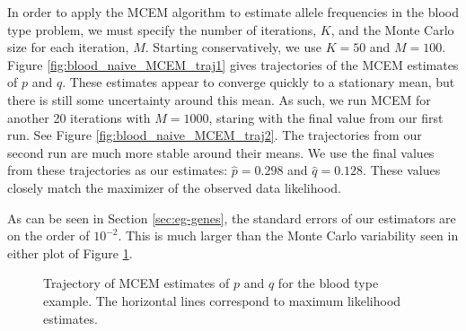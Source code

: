 \documentclass[ss]{imsart}
\theoremstyle{plain}
\theoremstyle{definition}
\theoremstyle{remark}
\begin{document}
In order to apply the MCEM algorithm to estimate allele frequencies in the blood type problem, we must specify the number of iterations, $K$, and the Monte Carlo size for each iteration, $M$. Starting conservatively, we use $K=50$ and $M=100$. Figure \ref{fig:blood_naive_MCEM_traj1} gives trajectories of the MCEM estimates of $p$ and $q$. These estimates appear to converge quickly to a stationary mean, but there is still some uncertainty around this mean. As such, we run MCEM for another 20 iterations with $M=1000$, staring with the final value from our first run. See Figure \ref{fig:blood_naive_MCEM_traj2}. The trajectories from our second run are much more stable around their means. We use the final values from these trajectories as our estimates: $\hat{p} = 0.298$ and $\hat{q} = 0.128$. These values closely match the maximizer of the observed data likelihood. 

As can be seen in Section \ref{sec:eg-genes}, the standard errors of our estimators are on the order of $10^{-2}$. This is much larger than the Monte Carlo variability seen in either plot of Figure \ref{fig:blood_naive_MCEM_traj}.

   



\begin{figure}
    \centering
    \caption{Trajectory of MCEM estimates of $p$ and $q$ for the blood type example. The horizontal lines correspond to maximum likelihood estimates.}
    \label{fig:blood_naive_MCEM_traj}
    
\end{figure}
\end{document}
